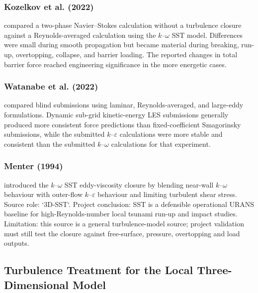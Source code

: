 \subsubsection{Kozelkov et al. (2022)}
\label{sec:res-mod-src-evidence-kozelkov-2022}

\textcite{kozelkov2022turbulence} compared a two-phase
Navier--Stokes calculation without a turbulence closure against a
Reynolds-averaged calculation using the $k$--$\omega$ SST model.
Differences were small during smooth propagation but became material
during breaking, run-up, overtopping, collapse, and barrier loading.
The reported changes in total barrier force reached engineering
significance in the more energetic cases.

\subsubsection{Watanabe et al. (2022)}
\label{sec:res-mod-src-evidence-watanabe-2022}

\textcite{watanabe2022validation} compared blind submissions using
laminar, Reynolds-averaged, and large-eddy formulations. Dynamic
sub-grid kinetic-energy LES submissions generally produced more
consistent force predictions than fixed-coefficient Smagorinsky
submissions, while the submitted $k$--$\varepsilon$ calculations were
more stable and consistent than the submitted $k$--$\omega$
calculations for that experiment.

\subsubsection{Menter (1994)}
\label{sec:res-mod-src-evidence-menter-1994}

\textcite{menter1994twoequation} introduced the $k$--$\omega$ SST
eddy-viscosity closure by blending near-wall $k$--$\omega$ behaviour
with outer-flow $k$--$\varepsilon$ behaviour and limiting turbulent
shear stress. Source role: `3D-SST`. Project conclusion: SST is a
defensible operational URANS baseline for high-Reynolds-number local
tsunami run-up and impact studies. Limitation: this source is a
general turbulence-model source; project validation must still test the
closure against free-surface, pressure, overtopping and load outputs.

\subsection{Turbulence Treatment for the Local Three-Dimensional Model}
\label{sec:res-mod-src-local-turbulence}

